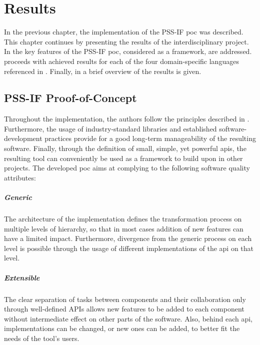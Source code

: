 \chapter{Results}
\label{chap:results}

In the previous chapter, the implementation of the PSS-IF \gls{poc} was described. This chapter continues by presenting the results of the interdisciplinary project. In  the key features of the PSS-IF \gls{poc}, considered as a framework, are addressed.  proceeds with achieved results for each of the four domain-specific languages referenced in . Finally, in  a brief overview of the results is given.

\section{PSS-IF Proof-of-Concept}
\label{sec:results:framework}

Throughout the implementation, the authors follow the principles described in . Furthermore, the usage of industry-standard libraries and established software-development practices provide for a good long-term manageability of the resulting software. Finally, through the definition of small, simple, yet powerful \glspl{api}, the resulting tool can conveniently be used as a framework to build upon in other projects. The developed \gls{poc} aims at complying to the following software quality attributes:

\paragraph{Generic} The architecture of the implementation defines the transformation process on multiple levels of hierarchy, so that in most cases addition of new features can have a limited impact. Furthermore, divergence from the generic process on each level is possible through the usage of different implementations of the \gls{api} on that level.

\paragraph{Extensible} The clear separation of tasks between components and their collaboration only through well-defined APIs allows new features to be added to each component without intermediate effect on other parts of the software. Also, behind each \gls{api}, implementations can be changed, or new ones can be added, to better fit the needs of the tool's users.

